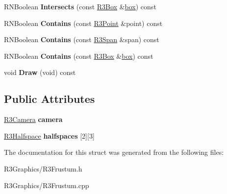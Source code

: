 \begin{DoxyCompactItemize}
\item 
R\+N\+Boolean {\bfseries Intersects} (const \hyperlink{class_r3_box}{R3\+Box} \&\hyperlink{structbox}{box}) const \hypertarget{struct_r3_frustum_a0ac494f2de905ce5644bb5ffadf8099b}{}\label{struct_r3_frustum_a0ac494f2de905ce5644bb5ffadf8099b}

\item 
R\+N\+Boolean {\bfseries Contains} (const \hyperlink{class_r3_point}{R3\+Point} \&point) const \hypertarget{struct_r3_frustum_a5c8e2c1824f9a9312adbdc936f70d920}{}\label{struct_r3_frustum_a5c8e2c1824f9a9312adbdc936f70d920}

\item 
R\+N\+Boolean {\bfseries Contains} (const \hyperlink{class_r3_span}{R3\+Span} \&span) const \hypertarget{struct_r3_frustum_a7b5430be3f72ec0cb75295788f33357b}{}\label{struct_r3_frustum_a7b5430be3f72ec0cb75295788f33357b}

\item 
R\+N\+Boolean {\bfseries Contains} (const \hyperlink{class_r3_box}{R3\+Box} \&\hyperlink{structbox}{box}) const \hypertarget{struct_r3_frustum_a9462950da6a7bccacad9145aeba864d0}{}\label{struct_r3_frustum_a9462950da6a7bccacad9145aeba864d0}

\item 
void {\bfseries Draw} (void) const \hypertarget{struct_r3_frustum_a28b625c7c0975f8261b2604cd174c02a}{}\label{struct_r3_frustum_a28b625c7c0975f8261b2604cd174c02a}

\end{DoxyCompactItemize}
\subsection*{Public Attributes}
\begin{DoxyCompactItemize}
\item 
\hyperlink{class_r3_camera}{R3\+Camera} {\bfseries camera}\hypertarget{struct_r3_frustum_a01976de96489f9aa190b5512aaa58964}{}\label{struct_r3_frustum_a01976de96489f9aa190b5512aaa58964}

\item 
\hyperlink{class_r3_halfspace}{R3\+Halfspace} {\bfseries halfspaces} \mbox{[}2\mbox{]}\mbox{[}3\mbox{]}\hypertarget{struct_r3_frustum_a1fbff48418da119afd0f35dfdce5419f}{}\label{struct_r3_frustum_a1fbff48418da119afd0f35dfdce5419f}

\end{DoxyCompactItemize}


The documentation for this struct was generated from the following files\+:\begin{DoxyCompactItemize}
\item 
R3\+Graphics/R3\+Frustum.\+h\item 
R3\+Graphics/R3\+Frustum.\+cpp\end{DoxyCompactItemize}

